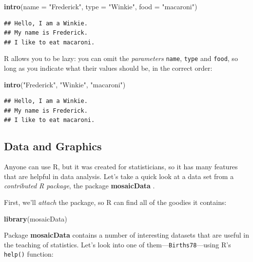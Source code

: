 \documentclass[]{book}
\makeatletter
\newenvironment{Shaded}{\begin{snugshade}}{\end{snugshade}}
\newcommand{\KeywordTok}[1]{\textcolor[rgb]{0.13,0.29,0.53}{\textbf{{#1}}}}
\newcommand{\DataTypeTok}[1]{\textcolor[rgb]{0.13,0.29,0.53}{{#1}}}
\newcommand{\StringTok}[1]{\textcolor[rgb]{0.31,0.60,0.02}{{#1}}}
\newcommand{\NormalTok}[1]{{#1}}
\newenvironment{kframe}{%
\medskip{}
\setlength{\fboxsep}{.8em}
 \def\at@end@of@kframe{}%
 \ifinner\ifhmode%
  \def\at@end@of@kframe{\end{minipage}}%
  \begin{minipage}{\columnwidth}%
 \fi\fi%
 \def\FrameCommand##1{\hskip\@totalleftmargin \hskip-\fboxsep
 \colorbox{shadecolor}{##1}\hskip-\fboxsep
     \hskip-\linewidth \hskip-\@totalleftmargin \hskip\columnwidth}%
 \MakeFramed {\advance\hsize-\width
   \@totalleftmargin\z@ \linewidth\hsize
   \@setminipage}}%
 {\par\unskip\endMakeFramed%
 \at@end@of@kframe}
\renewenvironment{Shaded}{\begin{kframe}}{\end{kframe}}
\theoremstyle{definition}
\theoremstyle{definition}
\theoremstyle{remark}
\makeatother
\begin{document}
\begin{Shaded}
\begin{Highlighting}[]
\KeywordTok{intro}\NormalTok{(}\DataTypeTok{name =} \StringTok{"Frederick"}\NormalTok{, }\DataTypeTok{type =} \StringTok{"Winkie"}\NormalTok{, }\DataTypeTok{food =} \StringTok{"macaroni"}\NormalTok{)}
\end{Highlighting}
\end{Shaded}

\begin{verbatim}
## Hello, I am a Winkie.  
## My name is Frederick.
## I like to eat macaroni.
\end{verbatim}

R allows you to be lazy: you can omit the \emph{parameters}
\texttt{name}, \texttt{type} and \texttt{food}, so long as you indicate
what their values should be, in the correct order:

\begin{Shaded}
\begin{Highlighting}[]
\KeywordTok{intro}\NormalTok{(}\StringTok{"Frederick"}\NormalTok{, }\StringTok{"Winkie"}\NormalTok{, }\StringTok{"macaroni"}\NormalTok{)}
\end{Highlighting}
\end{Shaded}

\begin{verbatim}
## Hello, I am a Winkie.  
## My name is Frederick.
## I like to eat macaroni.
\end{verbatim}

\subsection{Data and Graphics}\label{idea-data}

Anyone can use R, but it was created for statisticians, so it has many
features that are helpful in data analysis. Let's take a quick look at a
data set from a \emph{contributed R package}, the package
\textbf{mosaicData} \citep{R-mosaicData}.

First, we'll \emph{attach} the package,
 so R can find all of
the goodies it contains:

\begin{Shaded}
\begin{Highlighting}[]
\KeywordTok{library}\NormalTok{(mosaicData)}
\end{Highlighting}
\end{Shaded}

Package \textbf{mosaicData} contains a number of interesting datasets
that are useful in the teaching of statistics. Let's look into one of
them---\texttt{Births78}---using R's \texttt{help()} function:
\end{document}

